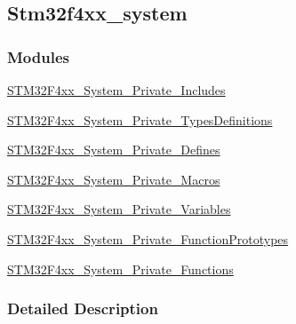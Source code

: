 \hypertarget{group__stm32f4xx__system}{}\subsection{Stm32f4xx\+\_\+system}
\label{group__stm32f4xx__system}
\subsubsection*{Modules}
\begin{DoxyCompactItemize}
\item 
\hyperlink{group___s_t_m32_f4xx___system___private___includes}{S\+T\+M32\+F4xx\+\_\+\+System\+\_\+\+Private\+\_\+\+Includes}
\item 
\hyperlink{group___s_t_m32_f4xx___system___private___types_definitions}{S\+T\+M32\+F4xx\+\_\+\+System\+\_\+\+Private\+\_\+\+Types\+Definitions}
\item 
\hyperlink{group___s_t_m32_f4xx___system___private___defines}{S\+T\+M32\+F4xx\+\_\+\+System\+\_\+\+Private\+\_\+\+Defines}
\item 
\hyperlink{group___s_t_m32_f4xx___system___private___macros}{S\+T\+M32\+F4xx\+\_\+\+System\+\_\+\+Private\+\_\+\+Macros}
\item 
\hyperlink{group___s_t_m32_f4xx___system___private___variables}{S\+T\+M32\+F4xx\+\_\+\+System\+\_\+\+Private\+\_\+\+Variables}
\item 
\hyperlink{group___s_t_m32_f4xx___system___private___function_prototypes}{S\+T\+M32\+F4xx\+\_\+\+System\+\_\+\+Private\+\_\+\+Function\+Prototypes}
\item 
\hyperlink{group___s_t_m32_f4xx___system___private___functions}{S\+T\+M32\+F4xx\+\_\+\+System\+\_\+\+Private\+\_\+\+Functions}
\end{DoxyCompactItemize}


\subsubsection{Detailed Description}
